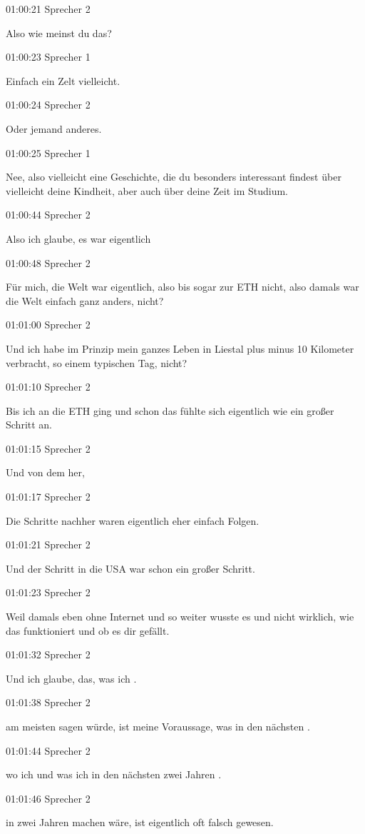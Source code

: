 01:00:21 Sprecher 2

Also wie meinst du das?

01:00:23 Sprecher 1

Einfach ein Zelt vielleicht.

01:00:24 Sprecher 2

Oder jemand anderes.

01:00:25 Sprecher 1

Nee, also vielleicht eine Geschichte, die du besonders interessant
findest über vielleicht deine Kindheit, aber auch über deine Zeit im
Studium.

01:00:44 Sprecher 2

Also ich glaube, es war eigentlich

01:00:48 Sprecher 2

Für mich, die Welt war eigentlich, also bis sogar zur ETH nicht, also
damals war die Welt einfach ganz anders, nicht?

01:01:00 Sprecher 2

Und ich habe im Prinzip mein ganzes Leben in Liestal plus minus 10
Kilometer verbracht, so einem typischen Tag, nicht?

01:01:10 Sprecher 2

Bis ich an die ETH ging und schon das fühlte sich eigentlich wie ein
großer Schritt an.

01:01:15 Sprecher 2

Und von dem her,

01:01:17 Sprecher 2

Die Schritte nachher waren eigentlich eher einfach Folgen.

01:01:21 Sprecher 2

Und der Schritt in die USA war schon ein großer Schritt.

01:01:23 Sprecher 2

Weil damals eben ohne Internet und so weiter wusste es und nicht
wirklich, wie das funktioniert und ob es dir gefällt.

01:01:32 Sprecher 2

Und ich glaube, das, was ich .

01:01:38 Sprecher 2

am meisten sagen würde, ist meine Voraussage, was in den nächsten .

01:01:44 Sprecher 2

wo ich und was ich in den nächsten zwei Jahren .

01:01:46 Sprecher 2

in zwei Jahren machen wäre, ist eigentlich oft falsch gewesen.

